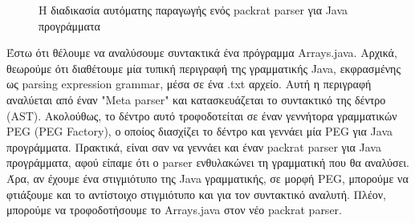 \begin{figure}[h]
\caption{Η διαδικασία αυτόματης παραγωγής ενός packrat parser για Java προγράμματα}
\label{fig:peg_factory_pipeline}
\end{figure}

Έστω ότι θέλουμε να αναλύσουμε συντακτικά ένα πρόγραμμα Arrays.java.
Αρχικά, θεωρούμε ότι διαθέτουμε μία τυπική περιγραφή της γραμματικής Java, εκφρασμένης ως parsing expression grammar, μέσα σε ένα .txt αρχείο.
Αυτή η περιγραφή αναλύεται από έναν "Meta parser" και κατασκευάζεται το συντακτικό της δέντρο (AST).
Ακολούθως, το δέντρο αυτό τροφοδοτείται σε έναν γεννήτορα γραμματικών PEG (PEG Factory), ο οποίος διασχίζει το δέντρο και γεννάει μία PEG για Java προγράμματα.
Πρακτικά, είναι σαν να γεννάει και έναν packrat parser για Java προγράμματα, αφού είπαμε ότι ο parser ενθυλακώνει τη γραμματική που θα αναλύσει.
Άρα, αν έχουμε ένα στιγμιότυπο της Java γραμματικής, σε μορφή PEG, μπορούμε να φτιάξουμε και το αντίστοιχο στιγμιότυπο και για τον συντακτικό αναλυτή.
Πλέον, μπορούμε να τροφοδοτήσουμε το Arrays.java στον νέο packrat parser.

